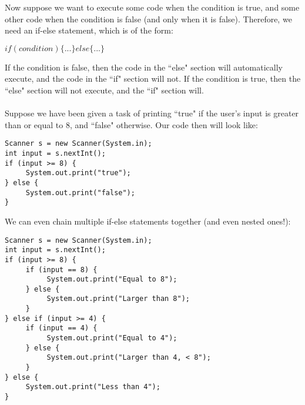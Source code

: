 Now suppose we want to execute some code when the condition is true, and some other code when the condition is false (and only when it is false). Therefore, we need an if-else statement, which is of the form:
\begin{center}
$if(condition) \{...\} else \{...\}$
\end{center}
If the condition is false, then the code in the ``else" section will automatically execute, and the code in the ``if" section will not. If the condition is true, then the ``else" section will not execute, and the ``if" section will.
\\ \\
Suppose we have been given a task of printing ``true" if the user's input is greater than or equal to 8, and ``false" otherwise. Our code then will look like:
\begin{lstlisting}
Scanner s = new Scanner(System.in);
int input = s.nextInt();
if (input >= 8) {
     System.out.print("true");
} else {
     System.out.print("false");
}
\end{lstlisting}
We can even chain multiple if-else statements together (and even nested ones!):
\begin{lstlisting}
Scanner s = new Scanner(System.in);
int input = s.nextInt();
if (input >= 8) {
     if (input == 8) {
          System.out.print("Equal to 8");
     } else {
          System.out.print("Larger than 8");
     }
} else if (input >= 4) {
     if (input == 4) {
          System.out.print("Equal to 4");
     } else {
          System.out.print("Larger than 4, < 8");
     }
} else {
     System.out.print("Less than 4");
}
\end{lstlisting}

